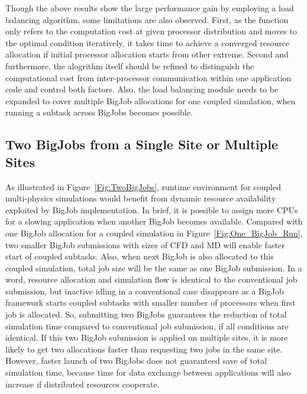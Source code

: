 \documentclass[conference,final]{IEEEtran}
\begin{document}
Though the above results show the large performance gain by employing a load balancing 
algorithm, some limitations are also observed. First, as the function only refers to the 
computation cost at given processor distribution and moves to the optimal condition 
iteratively, it takes time to achieve a converged resource allocation if initial 
processor allocation starts from other extreme. Second and furthermore, the alogrithm 
itself should be refined to distinguish the computational cost from inter-processor 
communication within one application code and control both factors. Also, the load 
balancing module needs to be expanded to cover multiple BigJob allocations for one 
coupled simulation, when running a subtask across BigJobs becomes possible.


\subsection{Two BigJobs from a Single Site or Multiple Sites}


As illustrated in Figure~\ref{Fig:TwoBigJobs}, runtime environment for coupled 
multi-physics simulations would benefit from dynamic resource availability exploited by 
BigJob implementation. In brief, it is possible to assign more CPUs for a slowing 
application when another BigJob becomes available. Compared with one BigJob allocation 
for a coupled simulation in Figure~\ref{Fig:One_BigJob_Run}, two smaller BigJob 
submissions with sizes of CFD and MD will enable faster start of coupled subtasks. Also, 
when next BigJob is also allocated to this coupled simulation, total job size will be the 
same as one BigJob submission. In a word, resource allocation and simulation flow is 
identical to the conventional job submission, but inactive idling in a conventional case 
disappears as a BigJob framework starts coupled subtasks with smaller number of 
processors when first job is allocated. So, submitting two BigJobs guarantees the 
reduction of total simulation time compared to conventional job submission, if all 
conditions are identical. If this two BigJob submission is applied on multiple sites, it 
is more likely to get two allocations faster than requesting two jobs in the same site. 
However, faster launch of two BigJobs does not guaranteed save of total simulation time, 
because time for data exchange between applications will also increase if distributed 
resources cooperate.
\end{document}
